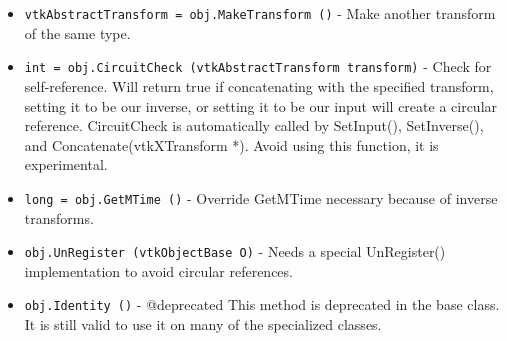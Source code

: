 \begin{itemize}
\item  \verb|vtkAbstractTransform = obj.MakeTransform ()| -  Make another transform of the same type.

\item  \verb|int = obj.CircuitCheck (vtkAbstractTransform transform)| -  Check for self-reference.  Will return true if concatenating
 with the specified transform, setting it to be our inverse,
 or setting it to be our input will create a circular reference.
 CircuitCheck is automatically called by SetInput(), SetInverse(),
 and Concatenate(vtkXTransform *).  Avoid using this function,
 it is experimental.

\item  \verb|long = obj.GetMTime ()| -  Override GetMTime necessary because of inverse transforms.

\item  \verb|obj.UnRegister (vtkObjectBase O)| -  Needs a special UnRegister() implementation to avoid
 circular references.

\item  \verb|obj.Identity ()| -  @deprecated This method is deprecated in the base class.  It is 
 still valid to use it on many of the specialized classes.

\end{itemize}
